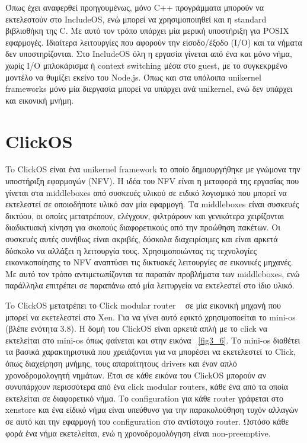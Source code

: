 Όπως έχει αναφερθεί προηγουμένως, μόνο C++ προγράμματα μπορούν να εκτελεστούν
στο IncludeOS, ενώ μπορεί να χρησιμοποιηθεί και η standard βιβλιοθήκη της C. Με
αυτό τον τρόπο υπάρχει μία μερική υποστήριξη για POSIX εφαρμογές. Ιδιαίτερα
λειτουργίες που αφορούν την είσοδο/έξοδο (Ι/Ο) και τα νήματα δεν υποστηρίζονται.
Στο IncludeOS όλη η εργασία γίνεται από ένα και μόνο νήμα, χωρίς I/O μπλοκάρισμα
ή context switching μέσα στο guest, με το συγκεκρμένο μοντέλο να θυμίζει εκείνο
του Node.js. Όπως και στα υπόλοιπα unikernel frameworks μόνο μία διεργασία
μπορεί να υπάρχει ανά unikernel, ενώ δεν υπάρχει και εικονική μνήμη.


\section{ClickOS}
To ClickOS είναι ένα unikernel framework το οποίο δημιουργήθηκε με γνώμονα την
υποστήριξη εφαρμογών  (NFV). H ιδέα του NFV είναι
η μεταφορά της εργασίας που γίνεται στα middleboxes από συσκευές υλικού σε
ειδικό λογισμικό που μπορεί να εκτελεστεί σε οποιοδήποτε υλικό σαν μία εφαρμογή.
Τα middleboxes είναι συσκευές δικτύου, οι οποίες μετατρέπουν, ελέγχουν,
φιλτράρουν και γενικότερα χειρίζονται διαδικτυακή κίνηση για σκοπούς
διαφορετικούς από την προώθηση πακέτων. Οι συσκευές αυτές συνήθως είναι ακριβές,
δύσκολα διαχειρίσιμες και είναι αρκετά δύσκολο να αλλάξει η λειτουργία τους.
Χρησιμοποιώντας τις τεχνολογίες εικονικοποίησης το NFV αναπτύσει τις δικτυακές
λειτουργίες σε εικονικές μηχανές. Με αυτό τον τρόπο αντιμετωπίζονται τα παραπάν
προβλήματα των middleboxes, ενώ παράλληλα επιτρέπει σε παραπάνω από μία
λειτυργεία να εκτελεστεί στο ίδιο υλικό.

To ClickOS μετατρέπει το Click modular router ~\cite{kohler2000click} σε μία
εικονική μηχανή που μπορεί να εκετελεστεί στο Xen. Για να γίνει αυτό εφικτό
χρησιμοποείται το mini-os (βλέπε ενότητα 3.8). H δομή του ClickOS είναι αρκετά
απλή με το click να εκτελείται στο mini-os όπως φαίνεται και στην εικόνα
~\ref{fig3_6}. Το mini-os διαθέτει τα βασικά χαρακτηριστικά που χρειάζονται για
να μπορέσει να εκετελεστεί το Click, όπως διαχείρηση μνήμης, τους απαραίτητους
drivers και έναν απλό χρονοδρομολογητή νημάτων. Έτσι σε κάθε εικόνα του ClickOS
μπορούν αν συνυπάρχουν περισσότερα από ένα click modular routers, κάθε ένα από
τα οποία εκτελείται σε διαφορετικό νήμα. Το configuration για κάθε router
γράφεται στο xenstore και ένα είδικό νήμα είναι υπεύθυνσ για την παρακολούθηση
τυχόν αλλαγών σε αυτό και την εφαρμογή του configuration στο αντίστοιχο router.
Ωστόσο κάθε φορά ένα νήμα εκετελείται, ενώ η χρονοδρομολόγηση είναι
non-preemptive. 


